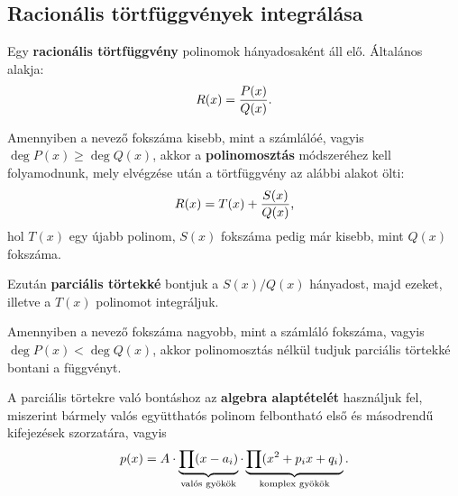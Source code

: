 \clearpage

\subsection{Racionális törtfüggvények integrálása}

\begin{blueBox}
  Egy \textbf{racionális törtfüggvény} polinomok hányadosaként áll elő.
  Általános alakja:
  \[
    R(x) = \frac{P(x)}{Q(x)}
    \text.
  \]

  Amennyiben a nevező fokszáma kisebb, mint a számlálóé, vagyis ${\deg P(x) \geq
      \deg Q(x)}$, akkor a \textbf{polinomosztás} módszeréhez kell folyamodnunk,
  mely elvégzése után a törtfüggvény az alábbi alakot ölti:
  \[
    R(x) = T(x) + \frac{S(x)}{Q(x)}
    \text,
  \]
  hol $T(x)$ egy újabb polinom, $S(x)$ fokszáma pedig már kisebb, mint $Q(x)$
  fokszáma.

  Ezután \textbf{parciális törtekké} bontjuk a $S(x) / Q(x)$ hányadost, majd
  ezeket, illetve a $T(x)$ polinomot integráljuk.

  Amennyiben a nevező fokszáma nagyobb, mint a számláló fokszáma, vagyis
  $\deg P(x) < \deg Q(x)$, akkor polinomosztás nélkül tudjuk parciális törtekké
  bontani a függvényt.

  A parciális törtekre való bontáshoz az \textbf{algebra alaptételét} használjuk
  fel, miszerint bármely valós együtthatós polinom felbontható első és
  másodrendű kifejezések szorzatára, vagyis
  \[
    p(x) = A
    \cdot
    \underbrace{\prod (x - a_i)}_{\text{valós gyökök}}
    \cdot
    \underbrace{\prod (x^2 + p_i x + q_i)}_{\text{komplex gyökök}}
    \text.
  \]
\end{blueBox}

